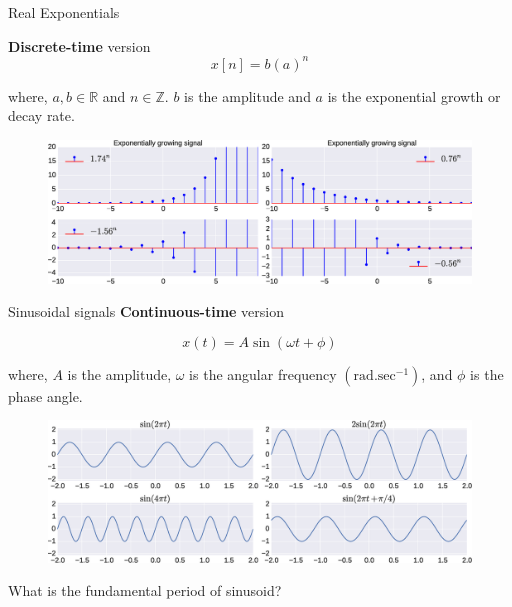 \documentclass[aspectratio=169]{beamer}
\begin{document}
\begin{frame}{Real Exponentials}

\textbf{Discrete-time} version
\[ x[n] =  b \left(a\right)^n \]

where, $a, b \in \mathbb{R}$ and $n \in \mathbb{Z}$. $b$ is the amplitude and $a$ is the exponential growth or decay rate.

\begin{figure}
\includegraphics[width=\textwidth]{img/disc_exp.eps}
\end{figure}
\end{frame}

\begin{frame}{Sinusoidal signals}
\textbf{Continuous-time} version

\[ x(t) = A \sin \left(\omega t + \phi\right) \]

where, $A$ is the amplitude, $\omega$ is the angular frequency $\left(\mathrm{rad}.\mathrm{sec}^{-1}\right)$, and $\phi$ is the phase angle.

\begin{figure}
\includegraphics[width=\textwidth]{img/sinu.eps}
\end{figure}

What is the fundamental period of sinusoid?
\end{frame}
\end{document}
